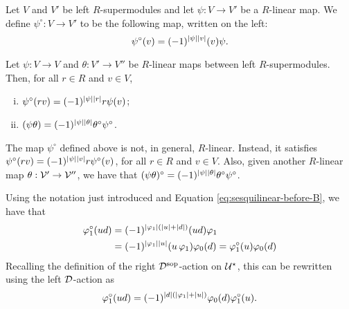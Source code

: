 \documentclass{amsbook}
\begin{document}
\begin{defi}
    Let $V$ and $V'$ be left $R$-supermodules and let $\psi: V \to V'$ be a $R$-linear map. We define $\psi^\circ: V \to  V'$ to be the following map, written on the left:
    \[
        \psi^\circ(v) = (-1)^{|\psi||v|} (v)\psi.
    \]
\end{defi}

\begin{lemma}
    Let $\psi: V \to V$ and $\theta: V' \to V''$ be $R$-linear maps between left $R$-supermodules. Then, for all $r\in R$ and $v\in V$,
    \begin{enumerate}[(i)]
        \item $\psi^\circ (rv) = (-1)^{|\psi||r|} r\psi(v)$;
        \item $(\psi\theta) = (-1)^{|\psi||\theta|} \theta^\circ \psi^\circ$.
    \end{enumerate}
    
\end{lemma}

\begin{remark}
    The map $\psi^\circ$ defined above is not, in general, $R$-linear. Instead, it satisfies $\psi^\circ (rv) = (-1)^{|\psi||v|} r \psi^\circ (v)$, for all $r\in R$ and $v\in V$. 
    Also, given another $R$-linear map $\theta: \mathcal V' \to \mathcal V''$, we have that $(\psi\theta)^\circ = (-1)^{|\psi||\theta|} \theta^\circ\psi^\circ$.


\end{remark}

Using the notation just introduced and Equation \eqref{eq:sesquilinear-before-B}, we have that
%
\begin{equation*}%
    \begin{split}
        \vphi_1^\circ (ud) &= (-1)^{|\vphi_1|(|u|+|d|)} (ud)\vphi_1 \\
        &=\sign{\vphi_1}{u}(u\,\vphi_1 )\vphi_0(d) = 
        \vphi_1^\circ (u) \vphi_0 (d)
    \end{split}
\end{equation*}
%
Recalling the definition of the right $\mathcal{D}^{\mathrm{sop}}$-action on $\mathcal U^\star$, this can be rewritten using the left $\mathcal{D}$-action as
%
\begin{equation}\label{eq:sesquilinear-with-vphi1-circ}
    \varphi_1^\circ (ud) = (-1)^{|d|(|\varphi_1|+|u|)}\varphi_0 (d)\varphi_1^\circ (u).
\end{equation}
\end{document}
